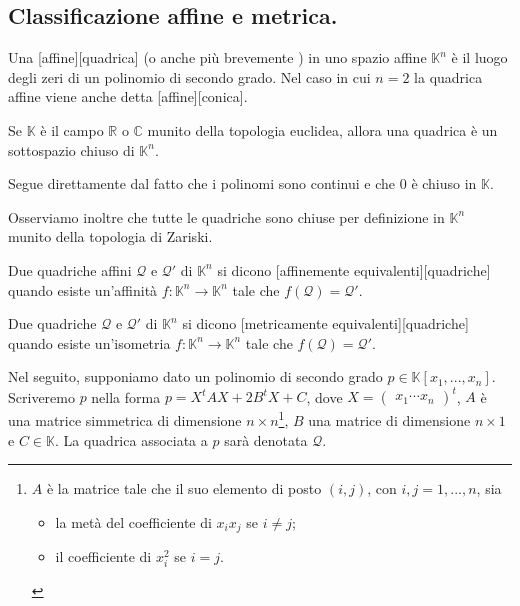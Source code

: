 \subsection{Classificazione affine e metrica.}

\begin{Definition}\label{def39}
	Una [affine][quadrica] (o anche pi\`u brevemente ) in uno spazio affine $\mathbb{K}^n$ \`e il luogo degli zeri di un polinomio di secondo grado. Nel caso in cui $n = 2$ la quadrica affine viene anche detta [affine][conica].
\end{Definition}
\begin{Theorem}\label{th46}
	Se $\mathbb{K}$ \`e il campo $\mathbb{R}$ o $\mathbb{C}$ munito della topologia euclidea, allora una quadrica \`e un sottospazio chiuso di $\mathbb{K}^n$.
\end{Theorem}
\Proof Segue direttamente dal fatto che i polinomi sono continui e che $0$ \`e chiuso in $\mathbb{K}$. \EndProof
\par Osserviamo inoltre che tutte le quadriche sono chiuse per definizione in $\mathbb{K}^n$ munito della topologia di Zariski.
\begin{Definition}\label{def40}
	Due quadriche affini $\mathcal{Q}$ e $\mathcal{Q}'$ di $\mathbb{K}^n$ si dicono [affinemente equivalenti][quadriche] quando esiste un'affinit\`a $f: \mathbb{K}^n \rightarrow \mathbb{K}^n$ tale che $f(\mathcal{Q}) = \mathcal{Q}'$.
\end{Definition}
\begin{Definition}\label{def41}
	Due quadriche $\mathcal{Q}$ e $\mathcal{Q}'$ di $\mathbb{K}^n$ si dicono [metricamente equivalenti][quadriche] quando esiste un'isometria $f: \mathbb{K}^n \rightarrow \mathbb{K}^n$ tale che $f(\mathcal{Q}) = \mathcal{Q}'$.
\end{Definition}
	\par Nel seguito, supponiamo dato un polinomio di secondo grado $p \in \mathbb{K}[x_1, ..., x_n]$. Scriveremo $p$ nella forma $p = X^tAX + 2 B^t X + C$, dove $X = \begin{pmatrix} x_1 \cdots x_n \end{pmatrix}^t$, $A$ \`e una matrice simmetrica di dimensione $n \times n$\footnote{$A$ \`e la matrice tale che il suo elemento di posto $(i,j)$, con $i, j = 1, ..., n$, sia \begin{itemize} \item la met\`a del coefficiente di $x_ix_j$ se $i \neq j$; \item il coefficiente di $x_i^2$ se $i = j$. \end{itemize}}, $B$ una matrice di dimensione $n \times 1$ e $C \in \mathbb{K}$. La quadrica associata a $p$ sar\`a denotata $\mathcal{Q}$.
